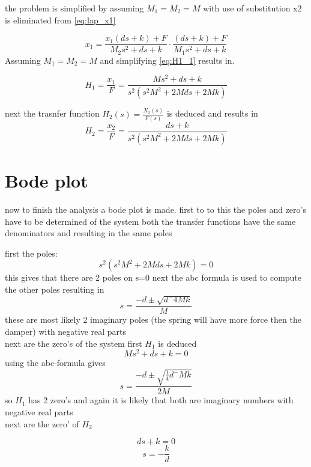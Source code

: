 the problem is simplified by assuming $M_1=M_2=M$ with use of substitution x2 is eliminated from \eqref{eq:lap_x1}

\begin{equation}
\label{eq:H1_1}
x_1=\frac{x_1(ds+k)+F}{M_2s^2+ds+k}\cdot\frac{(ds+k)+F}{M_1s^2+ds+k}
\end{equation}
Assuming $M_1=M_2=M$ and simplifying \eqref{eq:H1_1} results in.

\begin{equation}
\label{eq:H1_2}
H_1=\frac{x_1}{F}=\frac{Ms^2+ds+k}{s^2(s^2M^2+2Mds+2Mk)}
\end{equation}

next the trasnfer function ${ H }_{ 2 }(s)=\frac { { X }_{ 2 }(s) }{ F(s) } $ is deduced and results in
\begin{equation}
\label{eq:H2}
H_2=\frac{x_2}{F}=\frac{ds+k}{s^2(s^2M^2+2Mds+2Mk)}
\end{equation}
\section{Bode plot}
now to finish the analysis a bode plot is made.
first to to this the poles and zero's have to be determined of the system
both the transfer functions have the same denominators and resulting in the same poles

first the poles:
\begin{equation}
s^2(s^2M^2+2Mds+2Mk)=0
\end{equation}
this gives that there are 2 poles on s=0
next the abc formula is used to compute the other poles resulting in
\begin{equation}
s=\frac{-d\pm\sqrt{d^-4Mk}}{M}
\end{equation}
these are most likely 2 imaginary poles (the spring will have more force then the damper) with negative real parts\\
next are the zero's of the system first $H_1$ is deduced
\begin{equation}
Ms^2+ds+k=0
\end{equation}
using the abc-formula gives
\begin{equation}
s=\frac{-d\pm\sqrt{\frac{1}{4}d^-Mk}}{2M}
\end{equation}
so $H_1$ has 2 zero's and again it is likely that both are imaginary numbers with negative real parts\\
next are the zero' of $H_2$

\begin{equation}
ds+k=0
\end{equation}
\begin{equation}
s=-\frac{k}{d}
\end{equation}



